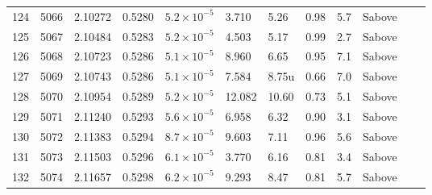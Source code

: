 \begin{longtable}{@{}rrllllllllll@{}}
 124 & 5066 & 2.10272 & 0.5280 & $5.2\times10^{-5}$ & 3.710 & 5.26 & 0.98 & 5.7 & Sabove &  &  \\
 125 & 5067 & 2.10484 & 0.5283 & $5.2\times10^{-5}$ & 4.503 & 5.17 & 0.99 & 2.7 & Sabove &  &  \\
 126 & 5068 & 2.10723 & 0.5286 & $5.1\times10^{-5}$ & 8.960 & 6.65 & 0.95 & 7.1 & Sabove &  &  \\
 127 & 5069 & 2.10743 & 0.5286 & $5.1\times10^{-5}$ & 7.584 & 8.75u & 0.66 & 7.0 & Sabove &  &  \\
 128 & 5070 & 2.10954 & 0.5289 & $5.2\times10^{-5}$ & 12.082 & 10.60 & 0.73 & 5.1 & Sabove &  &  \\
 129 & 5071 & 2.11240 & 0.5293 & $5.6\times10^{-5}$ & 6.958 & 6.32 & 0.90 & 3.1 & Sabove &  &  \\
 130 & 5072 & 2.11383 & 0.5294 & $8.7\times10^{-5}$ & 9.603 & 7.11 & 0.96 & 5.6 & Sabove &  &  \\
 131 & 5073 & 2.11503 & 0.5296 & $6.1\times10^{-5}$ & 3.770 & 6.16 & 0.81 & 3.4 & Sabove &  &  \\
 132 & 5074 & 2.11657 & 0.5298 & $6.2\times10^{-5}$ & 9.293 & 8.47 & 0.81 & 5.7 & Sabove &  &  \\
\end{longtable}
